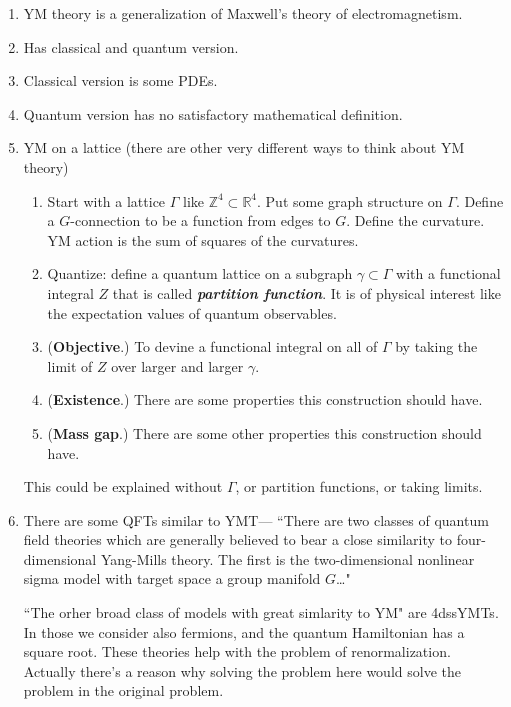 \begin{enumerate}
\item YM theory is a generalization of Maxwell's theory of electromagnetism.
\item Has classical and quantum version.
\item Classical version is some PDEs.
\item Quantum version has no satisfactory mathematical definition.
\item YM on a lattice (there are other very different ways to think about YM
theory)
	\begin{enumerate}
 \item Start with a lattice $\Gamma$ like $\mathbb{Z}^4 \subset \mathbb{R}^4$.
 Put some graph structure on $\Gamma$. Define a $G$-connection to be a function
 from edges to $G$. Define the curvature. YM action is the sum of squares of the
 curvatures.
 \item Quantize: define a quantum lattice on a subgraph $\gamma \subset \Gamma$
 with a functional integral $Z$ that is called \textit{\textbf{partition
 function}}. It is of physical interest like the expectation values of quantum
 observables.
 \item (\textbf{Objective}.) To devine a functional integral on all of $\Gamma$
 by taking the limit of $Z$ over larger and larger $\gamma$.
 \item (\textbf{Existence}.) There are some properties this construction should
 have.
 \item (\textbf{Mass gap}.) There are some other properties this construction
 should have.
	\end{enumerate}
 This could be explained without $\Gamma$, or partition functions, or taking
 limits.
\item There are some QFTs similar to YMT--- ``There are two classes of quantum
field theories which are generally believed to bear a close similarity to
four-dimensional Yang-Mills theory. The first is the two-dimensional nonlinear
sigma model with target space a group manifold \( G\)…"

 ``The orher broad class of models with great simlarity to YM" are 4dssYMTs. In
 those we consider also fermions, and the quantum Hamiltonian has a square root.
 These theories help with the problem of renormalization. Actually there's a
 reason why solving the problem here would solve the problem in the original
 problem.


\end{enumerate}
